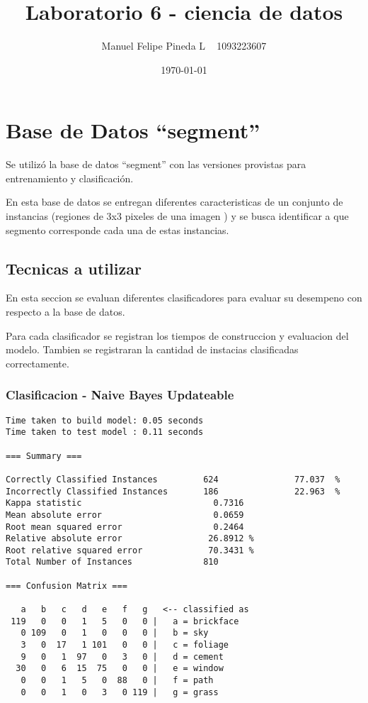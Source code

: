 \documentclass[a4paper]{article}
\title{Laboratorio 6 - ciencia de datos}
\author{Manuel Felipe Pineda L ~ 1093223607}
\date{\today}
\begin{document}
\maketitle

\section{Base de Datos ``segment''}

Se utilizó la base de datos ``segment'' con las versiones
provistas para entrenamiento y clasificación.

En esta base de datos se entregan diferentes caracteristicas
de un conjunto de instancias (regiones de 3x3 pixeles de una
imagen ) y se busca identificar a que segmento corresponde
cada una de estas instancias.

\subsection{Tecnicas a utilizar}
En esta seccion se evaluan diferentes clasificadores
para evaluar su desempeno con respecto a la base de datos.

Para cada clasificador se registran los tiempos de construccion
y evaluacion del modelo. Tambien se registraran la cantidad
de instacias clasificadas correctamente.

\subsubsection{Clasificacion - Naive Bayes Updateable}

\begin{verbatim}
Time taken to build model: 0.05 seconds
Time taken to test model : 0.11 seconds

=== Summary ===

Correctly Classified Instances         624               77.037  %
Incorrectly Classified Instances       186               22.963  %
Kappa statistic                          0.7316
Mean absolute error                      0.0659
Root mean squared error                  0.2464
Relative absolute error                 26.8912 %
Root relative squared error             70.3431 %
Total Number of Instances              810

=== Confusion Matrix ===

   a   b   c   d   e   f   g   <-- classified as
 119   0   0   1   5   0   0 |   a = brickface
   0 109   0   1   0   0   0 |   b = sky
   3   0  17   1 101   0   0 |   c = foliage
   9   0   1  97   0   3   0 |   d = cement
  30   0   6  15  75   0   0 |   e = window
   0   0   1   5   0  88   0 |   f = path
   0   0   1   0   3   0 119 |   g = grass

\end{verbatim}
\end{document}
